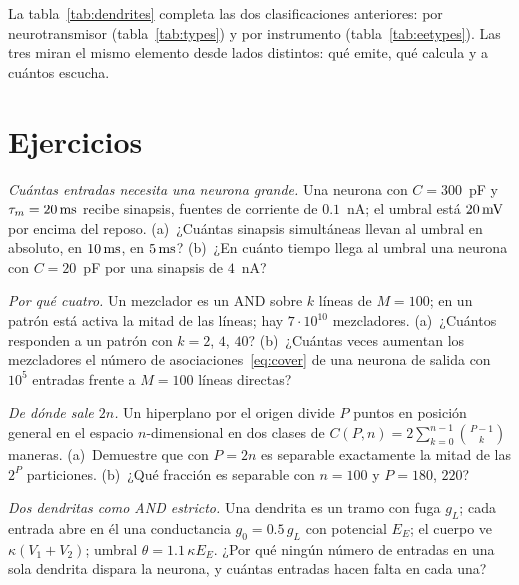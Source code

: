 La tabla~\ref{tab:dendrites} completa las dos clasificaciones anteriores: por neurotransmisor (tabla~\ref{tab:types}) y por instrumento (tabla~\ref{tab:eetypes}). Las tres miran el mismo elemento desde lados distintos: qué emite, qué calcula y a cuántos escucha.

\section{Ejercicios}

\begin{exercise}[\lvlA]
\label{ex:19:1}
\emph{Cuántas entradas necesita una neurona grande.} Una neurona con $C=300$~pF y $\tau_m=20\,\text{ms}$ recibe sinapsis, fuentes de corriente de $0.1$~nA; el umbral está $20\,\text{mV}$ por encima del reposo. (a)~¿Cuántas sinapsis simultáneas llevan al umbral en absoluto, en $10\,\text{ms}$, en $5\,\text{ms}$? (b)~¿En cuánto tiempo llega al umbral una neurona con $C=20$~pF por una sinapsis de $4$~nA?
\end{exercise}

\begin{exercise}[\lvlA]
\label{ex:19:2}
\emph{Por qué cuatro.} Un mezclador es un AND sobre $k$ líneas de $M=100$; en un patrón está activa la mitad de las líneas; hay $7\cdot10^{10}$ mezcladores. (a)~¿Cuántos responden a un patrón con $k=2$, $4$, $40$? (b)~¿Cuántas veces aumentan los mezcladores el número de asociaciones~\eqref{eq:cover} de una neurona de salida con $10^5$ entradas frente a $M=100$ líneas directas?
\end{exercise}

\begin{exercise}[\lvlB]
\label{ex:19:3}
\emph{De dónde sale $2n$.} Un hiperplano por el origen divide $P$ puntos en posición general en el espacio $n$-dimensional en dos clases de $C(P,n)=2\sum_{k=0}^{n-1}\binom{P-1}{k}$ maneras. (a)~Demuestre que con $P=2n$ es separable exactamente la mitad de las $2^P$ particiones. (b)~¿Qué fracción es separable con $n=100$ y $P=180$, $220$?
\end{exercise}

\begin{exercise}[\lvlB]
\label{ex:19:4}
\emph{Dos dendritas como AND estricto.} Una dendrita es un tramo con fuga $g_L$; cada entrada abre en él una conductancia $g_0=0.5\,g_L$ con potencial $E_E$; el cuerpo ve $\kappa(V_1+V_2)$; umbral $\theta=1.1\,\kappa E_E$. ¿Por qué ningún número de entradas en una sola dendrita dispara la neurona, y cuántas entradas hacen falta en cada una?
\end{exercise}

